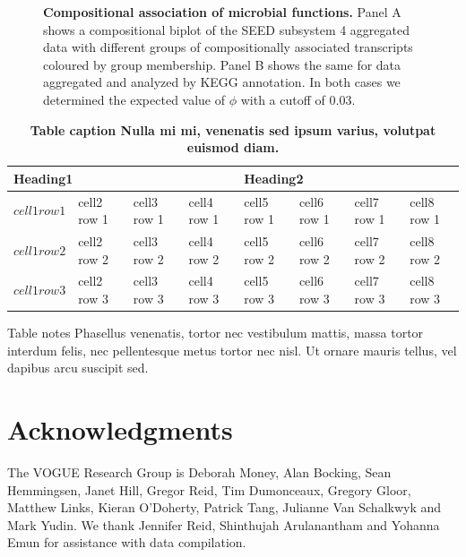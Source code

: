 \documentclass[10pt,letterpaper]{article}
\begin{document}
\begin{figure}[h]
\caption{{\bf Compositional association of microbial functions.}
Panel A shows a compositional biplot of the SEED subsystem 4 aggregated data with different groups of compositionally associated transcripts coloured by group membership. Panel B shows the same for data aggregated and analyzed by KEGG annotation. In both cases we determined the expected value of $\phi$ with a cutoff of 0.03. }
\label{F3:phi_biplot}
\end{figure}

\begin{table}[!ht]
\begin{adjustwidth}{-2.25in}{0in} %
\caption{
{\bf Table caption Nulla mi mi, venenatis sed ipsum varius, volutpat euismod diam.}}
\begin{tabular}{|l|l|l|l|l|l|l|l|}
\hline
\multicolumn{4}{|l|}{\bf Heading1} & \multicolumn{4}{|l|}{\bf Heading2}\\ \hline
$cell1 row1$ & cell2 row 1 & cell3 row 1 & cell4 row 1 & cell5 row 1 & cell6 row 1 & cell7 row 1 & cell8 row 1\\ \hline
$cell1 row2$ & cell2 row 2 & cell3 row 2 & cell4 row 2 & cell5 row 2 & cell6 row 2 & cell7 row 2 & cell8 row 2\\ \hline
$cell1 row3$ & cell2 row 3 & cell3 row 3 & cell4 row 3 & cell5 row 3 & cell6 row 3 & cell7 row 3 & cell8 row 3\\ \hline
\end{tabular}
\begin{flushleft} Table notes Phasellus venenatis, tortor nec vestibulum mattis, massa tortor interdum felis, nec pellentesque metus tortor nec nisl. Ut ornare mauris tellus, vel dapibus arcu suscipit sed.
\end{flushleft}
\label{table1}
\end{adjustwidth}
\end{table}

\section*{Acknowledgments}
The VOGUE Research Group is Deborah Money, Alan Bocking, Sean Hemmingsen, Janet Hill, Gregor Reid, Tim Dumonceaux, Gregory Gloor, Matthew Links, Kieran O'Doherty, Patrick Tang, Julianne Van Schalkwyk and Mark Yudin. We thank Jennifer Reid, Shinthujah Arulanantham and Yohanna Emun for assistance with data compilation.
\end{document}
